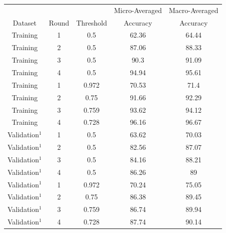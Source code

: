 \documentclass{report}
\theoremstyle{definition}
\theoremstyle{remark}
\begin{document}
\vspace*{-3cm}\begin{table}[H]
    \centering
   \begin{tabular}{ccccc}
    &&&Micro-Averaged & Macro-Averaged\\
    Dataset & Round & Threshold     & Accuracy &Accuracy\\
    \hline
    Training & 1 & 0.5 & 62.36&64.44\\
    Training & 2 & 0.5 & 87.06&88.33\\
    Training & 3 & 0.5 & 90.3&91.09\\
    Training & 4 & 0.5 & 94.94&95.61\\
    \hline
    Training & 1 & 0.972&70.53&71.4 \\
    Training & 2 & 0.75 &91.66&92.29\\
    Training & 3 & 0.759&93.62&94.12 \\
    Training & 4 & 0.728&96.16&96.67 \\
    \hline
    Validation$^1$ & 1 & 0.5&63.62&70.03 \\
    Validation$^1$ & 2 & 0.5&82.56&87.07 \\
    Validation$^1$ & 3 & 0.5&84.16&88.21 \\
    Validation$^1$ & 4 & 0.5&86.26&89 \\
    \hline
    Validation$^1$ & 1 & 0.972&70.24&75.05\\
    Validation$^1$ & 2 & 0.75 &86.38&89.45\\
    Validation$^1$ & 3 & 0.759&86.74&89.94\\
    Validation$^1$ & 4 & 0.728&87.74&90.14\\
    \end{tabular}
    

\end{table}
\end{document}

